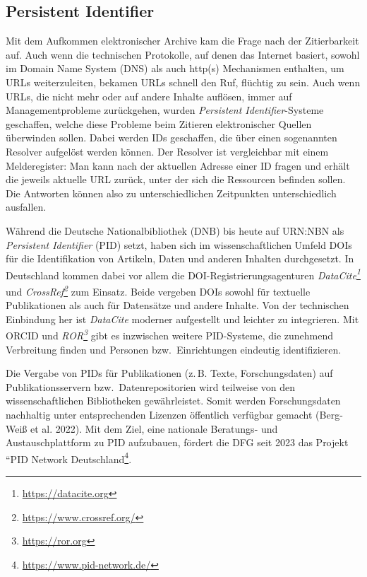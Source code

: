 \documentclass[
  11pt,
  letterpaper,
  DIV=11,
  twoside]{scrreprt}
\DeclareRobustCommand{\href}[2]{#2\footnote{\url{#1}}}
\begin{document}
\subsection{Persistent Identifier}\label{persistent-identifier}

Mit dem Aufkommen elektronischer Archive kam die Frage nach der
Zitierbarkeit auf. Auch wenn die technischen Protokolle, auf denen das
Internet basiert, sowohl im Domain Name System ({DNS}) als auch http(s)
Mechanismen enthalten, um URLs weiterzuleiten, bekamen URLs schnell den
Ruf, flüchtig zu sein. Auch wenn URLs, die nicht mehr oder auf andere
Inhalte auflösen, immer auf Managementprobleme zurückgehen, wurden
\emph{Persistent Identifier}-Systeme geschaffen, welche diese Probleme
beim Zitieren elektronischer Quellen überwinden sollen. Dabei werden IDs
geschaffen, die über einen sogenannten Resolver aufgelöst werden können.
Der Resolver ist vergleichbar mit einem Melderegister: Man kann nach der
aktuellen Adresse einer ID fragen und erhält die jeweils aktuelle URL
zurück, unter der sich die Ressourcen befinden sollen. Die Antworten
können also zu unterschiedlichen Zeitpunkten unterschiedlich ausfallen.

Während die Deutsche Nationalbibliothek (DNB) bis heute auf URN:NBN als
\emph{Persistent Identifier} ({PID}) setzt, haben sich im
wissenschaftlichen Umfeld DOIs für die Identifikation von Artikeln,
Daten und anderen Inhalten durchgesetzt. In Deutschland kommen dabei vor
allem die DOI-Registrierungsagenturen
\emph{\href{https://datacite.org}{DataCite}} und
\emph{\href{https://www.crossref.org/}{CrossRef}} zum Einsatz. Beide
vergeben DOIs sowohl für textuelle Publikationen als auch für Datensätze
und andere Inhalte. Von der technischen Einbindung her ist
\emph{DataCite} moderner aufgestellt und leichter zu integrieren. Mit
{ORCID} und \emph{\href{https://ror.org}{ROR}} gibt es inzwischen
weitere PID-Systeme, die zunehmend Verbreitung finden und Personen
bzw.~Einrichtungen eindeutig identifizieren.

Die Vergabe von PIDs für Publikationen (z.\,B. Texte, Forschungsdaten)
auf Publikationsservern bzw.~Datenrepositorien wird teilweise von den
wissenschaftlichen Bibliotheken gewährleistet. Somit werden
Forschungsdaten nachhaltig unter entsprechenden Lizenzen öffentlich
verfügbar gemacht (Berg-Weiß et al. 2022). Mit dem Ziel, eine nationale
Beratungs- und Austauschplattform zu PID aufzubauen, fördert die DFG
seit 2023 das Projekt ``\href{https://www.pid-network.de/}{PID Network
Deutschland}.
\end{document}
